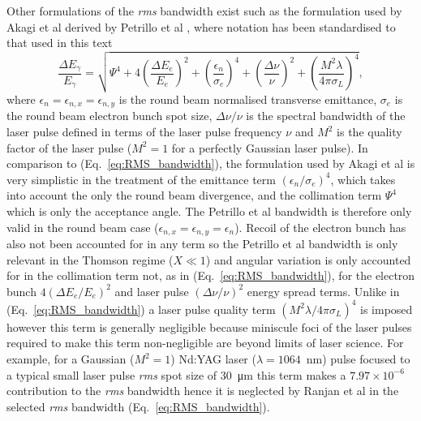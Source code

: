 \documentclass[../main.tex]{subfiles}
\begin{document}
Other formulations of the \textit{rms} bandwidth exist such as the formulation used by Akagi et al \cite{akagi2016narrow} derived by Petrillo et al \cite{petrillo2012photon}, where notation has been standardised to that used in this text 
\begin{equation}
\frac{\Delta E_{\gamma}}{E_{\gamma}} = \sqrt{\Psi^{4}+4\left(\frac{\Delta E_{e}}{E_{e}}\right)^{2}+\left(\frac{\epsilon_{n}}{\sigma_{e}}\right)^{4}+\left(\frac{\Delta\nu}{\nu}\right)^{2}+\left(\frac{M^{2}\lambda}{4\pi\sigma_{L}}\right)^{4}},
\label{eq:akagi_bandwidth}    
\end{equation}
where $\epsilon_{n}=\epsilon_{n,x}=\epsilon_{n,y}$ is the round beam normalised transverse emittance, $\sigma_{e}$ is the round beam electron bunch spot size, $\Delta\nu/\nu$ is the spectral bandwidth of the laser pulse defined in terms of the laser pulse frequency $\nu$ and $M^{2}$ is the quality factor of the laser pulse ($M^{2} = 1$ for a perfectly Gaussian laser pulse). In comparison to (Eq.~\ref{eq:RMS_bandwidth}), the formulation used by Akagi et al \cite{akagi2016narrow} is very simplistic in the treatment of the emittance term $\left(\epsilon_{n}/\sigma_{e}\right)^{4}$, which takes into account the only the round beam divergence, and the collimation term $\Psi^{4}$ which is only the acceptance angle. The Petrillo et al bandwidth is therefore only valid in the round beam case ($\epsilon_{n,x} = \epsilon_{n,y} = \epsilon_{n}$). Recoil of the electron bunch has also not been accounted for in any term so the Petrillo et al bandwidth is only relevant in the Thomson regime ($X \ll 1$) and angular variation is only accounted for in the collimation term not, as in (Eq.~\ref{eq:RMS_bandwidth}), for the electron bunch $4\left(\Delta E_{e}/E_{e}\right)^{2}$ and laser pulse $\left(\Delta\nu/\nu\right)^{2}$ energy spread terms. Unlike in (Eq.~\ref{eq:RMS_bandwidth}) a laser pulse quality term $\left(M^{2}\lambda/4\pi\sigma_{L}\right)^{4}$ is imposed however this term is generally negligible because miniscule foci of the laser pulses required to make this term non-negligible are beyond limits of laser science. For example, for a Gaussian ($M^{2}=1$) Nd:YAG laser ($\lambda = 1064$~\si{\nano\meter}) pulse focused to a typical small laser pulse \textit{rms} spot size of 30~\si{\micro\meter} this term makes a $7.97\times 10^{-6}$ contribution to the \textit{rms} bandwidth hence it is neglected by Ranjan et al \cite{ranjan2018simulation} in the selected \textit{rms} bandwidth (Eq.~\ref{eq:RMS_bandwidth}).   
\end{document}
